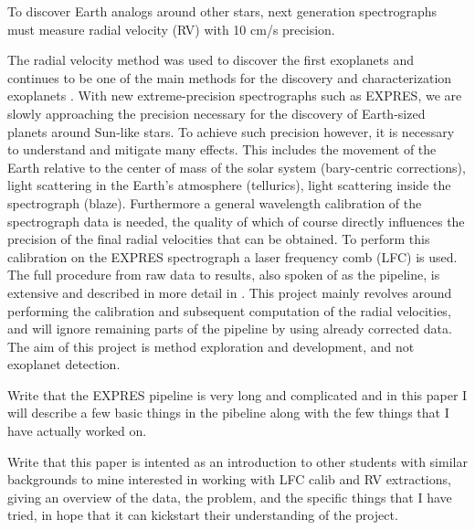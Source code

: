 
To discover Earth analogs around other stars, next generation spectrographs must measure radial velocity (RV) with 10 cm/s precision.

The radial velocity method was used to discover the first exoplanets and continues to be one of the main methods for the discovery and characterization exoplanets \cite{radial_velocity_techniques}. With new extreme-precision spectrographs such as EXPRES, we are slowly approaching the precision necessary for the discovery of Earth-sized planets around Sun-like stars. To achieve such precision however, it is necessary to understand and mitigate many effects. This includes the movement of the Earth relative to the center of mass of the solar system (bary-centric corrections), light scattering in the Earth's atmosphere (tellurics), light scattering inside the spectrograph (blaze). Furthermore a general wavelength calibration of the spectrograph data is needed, the quality of which of course directly influences the precision of the final radial velocities that can be obtained. To perform this calibration on the EXPRES spectrograph a laser frequency comb (LFC) is used. The full procedure from raw data to results, also spoken of as the pipeline, is extensive and described in more detail in \cite{first_RV_from_EXPRES}. This project mainly revolves around performing the calibration and subsequent computation of the radial velocities, and will ignore remaining parts of the pipeline by using already corrected data. The aim of this project is method exploration and development, and not exoplanet detection.

\vspace{0.5cm}
\todo{} Write that the EXPRES pipeline is very long and complicated and in this paper I will describe a few basic things in the pibeline along with the few things that I have actually worked on.

\todo{}Write that this paper is intented as an introduction to other students with similar backgrounds to mine interested in working with LFC calib and RV extractions, giving an overview of the data, the problem, and the specific things that I have tried, in hope that it can kickstart their understanding of the project.
